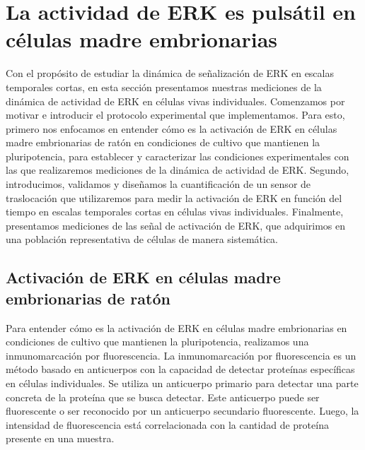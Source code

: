 \documentclass[./main.tex]{subfiles}
\begin{document}
\section{La actividad de ERK es pulsátil en células madre embrionarias}
\label{C2_sec:mediciones}

Con el propósito de estudiar la dinámica de señalización de ERK en escalas temporales cortas, en esta sección presentamos nuestras mediciones de la dinámica de actividad de ERK en células vivas individuales. Comenzamos por motivar e introducir el protocolo experimental que implementamos. Para esto, primero nos enfocamos en entender cómo es la activación de ERK en células madre embrionarias de ratón en condiciones de cultivo que mantienen la pluripotencia, para establecer y caracterizar las condiciones experimentales con las que realizaremos mediciones de la dinámica de actividad de ERK. Segundo, introducimos, validamos y diseñamos la cuantificación de un sensor de traslocación que utilizaremos para medir la activación de ERK en función del tiempo en escalas temporales cortas en células vivas individuales. Finalmente, presentamos mediciones de las señal de activación de ERK, que adquirimos en una población representativa de células de manera sistemática. 


\subsection{Activación de ERK en células madre embrionarias de ratón}

Para entender cómo es la activación de ERK en células madre embrionarias en condiciones de cultivo que mantienen la pluripotencia, realizamos una inmunomarcación por fluorescencia. La inmunomarcación por fluorescencia es un método basado en anticuerpos con la capacidad de detectar proteínas específicas en células individuales. Se utiliza un anticuerpo primario para detectar una parte concreta de la proteína que se busca detectar. Este anticuerpo puede ser fluorescente o ser reconocido por un anticuerpo secundario fluorescente. Luego, la intensidad de fluorescencia está correlacionada con la cantidad de proteína presente en una muestra.
\end{document}

